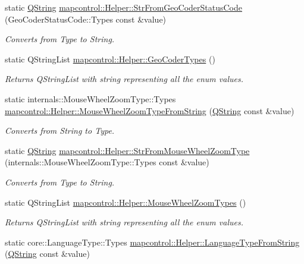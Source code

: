 \begin{DoxyCompactItemize}
static \hyperlink{group___u_a_v_objects_plugin_gab9d252f49c333c94a72f97ce3105a32d}{\-Q\-String} \hyperlink{group___o_p_map_widget_ga8641f35e4dcfdeb18e53899718555abb}{mapcontrol\-::\-Helper\-::\-Str\-From\-Geo\-Coder\-Status\-Code} (\-Geo\-Coder\-Status\-Code\-::\-Types const \&value)
\begin{DoxyCompactList}\small\item\em \-Converts from \-Type to \-String. \end{DoxyCompactList}\item 
static \-Q\-String\-List \hyperlink{group___o_p_map_widget_ga461898c6bdb8fe425dc78ff470a9867a}{mapcontrol\-::\-Helper\-::\-Geo\-Coder\-Types} ()
\begin{DoxyCompactList}\small\item\em \-Returns \-Q\-String\-List with string representing all the enum values. \end{DoxyCompactList}\item 
static \*
internals\-::\-Mouse\-Wheel\-Zoom\-Type\-::\-Types \hyperlink{group___o_p_map_widget_gab829c562d2443c5ffbe2c7d4b7071712}{mapcontrol\-::\-Helper\-::\-Mouse\-Wheel\-Zoom\-Type\-From\-String} (\hyperlink{group___u_a_v_objects_plugin_gab9d252f49c333c94a72f97ce3105a32d}{\-Q\-String} const \&value)
\begin{DoxyCompactList}\small\item\em \-Converts from \-String to \-Type. \end{DoxyCompactList}\item 
static \hyperlink{group___u_a_v_objects_plugin_gab9d252f49c333c94a72f97ce3105a32d}{\-Q\-String} \hyperlink{group___o_p_map_widget_ga66a0a97a25bc6f0c8e79a87e466a04b2}{mapcontrol\-::\-Helper\-::\-Str\-From\-Mouse\-Wheel\-Zoom\-Type} (internals\-::\-Mouse\-Wheel\-Zoom\-Type\-::\-Types const \&value)
\begin{DoxyCompactList}\small\item\em \-Converts from \-Type to \-String. \end{DoxyCompactList}\item 
static \-Q\-String\-List \hyperlink{group___o_p_map_widget_ga445f36c5148af8c77ebdf64269134267}{mapcontrol\-::\-Helper\-::\-Mouse\-Wheel\-Zoom\-Types} ()
\begin{DoxyCompactList}\small\item\em \-Returns \-Q\-String\-List with string representing all the enum values. \end{DoxyCompactList}\item 
static core\-::\-Language\-Type\-::\-Types \hyperlink{group___o_p_map_widget_ga1a7989d295311b564112f0adc0e9158d}{mapcontrol\-::\-Helper\-::\-Language\-Type\-From\-String} (\hyperlink{group___u_a_v_objects_plugin_gab9d252f49c333c94a72f97ce3105a32d}{\-Q\-String} const \&value)

\end{DoxyCompactItemize}
